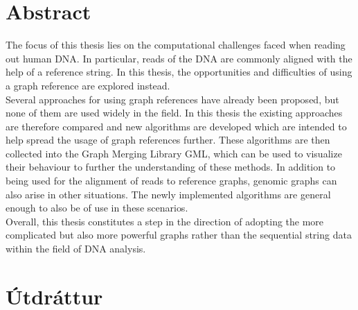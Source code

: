 \documentclass[a4paper,12pt,twoside,BCOR=10mm]{scrbook}
\begin{document}

\setcounter{page}{5}
\section*{\huge Abstract}


The focus of this thesis lies on the computational challenges faced when reading out human DNA. 
In particular, reads of the DNA are commonly aligned with the help of a reference string. 
In this thesis, the opportunities and difficulties of using a graph reference are explored instead. \\
Several approaches for using graph references have already been proposed, 
but none of them are used widely in the field. 
In this thesis the existing approaches are therefore compared and 
new algorithms are developed which are intended to help spread 
the usage of graph references further. 
These algorithms are then collected into the Graph Merging Library GML, 
which can be used to visualize their behaviour to further the understanding 
of these methods. 
In addition to being used for the alignment of reads to reference graphs, 
genomic graphs can also arise in other situations. 
The newly implemented algorithms are general enough to also be of use in these scenarios. \\
Overall, this thesis constitutes a step in the direction of adopting 
the more complicated but also more powerful graphs rather than the sequential string data 
within the field of DNA analysis.

\vspace*{1cm}
\section*{\huge Útdráttur}

\end{document}
